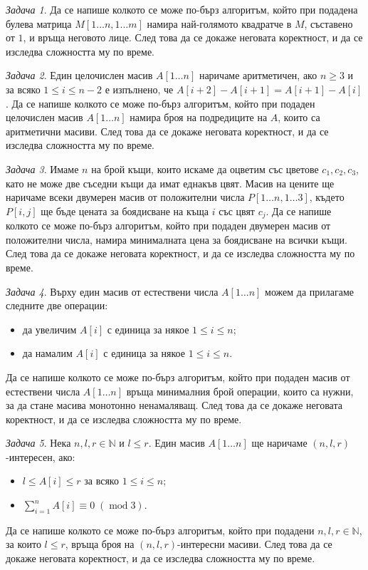 \documentclass{article}
\newcommand{\N}{\mathbb{N}}
\theoremstyle{definition}
\theoremstyle{plain}
\theoremstyle{remark}
\newtheorem{problem}{Задача}
\theoremstyle{definition}
\begin{document}
\begin{problem}
Да се напише колкото се може по-бърз алгоритъм, който при подадена булева матрица $M[1 \dots n, 1 \dots m]$ намира най-голямото квадратче в $M$, съставено от $1$, и връща неговото лице.
След това да се докаже неговата коректност, и да се изследва сложността му по време.
\end{problem}

\begin{problem}
Един целочислен масив $A[1 \dots n]$ наричаме аритметичен, ако $n \geq 3$ и за всяко $1 \leq i \leq n - 2$ е изпълнено, че $A[i + 2] - A[i + 1] = A[i + 1] - A[i]$.
Да се напише колкото се може по-бърз алгоритъм, който при подаден целочислен масив $A[1 \dots n]$ намира броя на подредиците на $A$, които са аритметични масиви.
След това да се докаже неговата коректност, и да се изследва сложността му по време.
\end{problem}

\begin{problem}
Имаме $n$ на брой къщи, които искаме да оцветим със цветове $c_1, c_2, c_3$, като не може две съседни къщи да имат еднакъв цвят.
Масив на цените ще наричаме всеки двумерен масив от положителни числа $P[1 \dots n, 1 \dots 3]$, където $P[i, j]$ ще бъде цената за боядисване на къща $i$ със цвят $c_j$.
Да се напише колкото се може по-бърз алгоритъм, който при подаден двумерен масив от положителни числа, намира минималната цена за боядисване на всички къщи.
След това да се докаже неговата коректност, и да се изследва сложността му по време.
\end{problem}

\begin{problem}
Върху един масив от естествени числа $A[1 \dots n]$ можем да прилагаме следните две операции:
\begin{itemize}
  \item да увеличим $A[i]$ с единица за някое $1 \leq i \leq n$;
  \item да намалим $A[i]$ с единица за някое $1 \leq i \leq n$.
\end{itemize}
Да се напише колкото се може по-бърз алгоритъм, който при подаден масив от естествени числа $A[1 \dots n]$ връща минималния брой операции, които са нужни, за да стане масива монотонно ненамаляващ.
След това да се докаже неговата коректност, и да се изследва сложността му по време.
\end{problem}

\begin{problem}
Нека $n, l, r \in \N$ и $l \leq r$.
Един масив $A[1 \dots n]$ ще наричаме $(n, l, r)$-интересен, ако:
\begin{itemize}
  \item $l \leq A[i] \leq r$ за всяко $1 \leq i \leq n$;
  \item $\sum\limits_{i = 1}^n A[i] \equiv 0 \; (\operatorname{mod} 3)$.
\end{itemize}
Да се напише колкото се може по-бърз алгоритъм, който при подадени $n, l, r \in \N$, за които $l \leq r$, връща броя на $(n, l, r)$-интересни масиви.
След това да се докаже неговата коректност, и да се изследва сложността му по време.
\end{problem}
\end{document}
